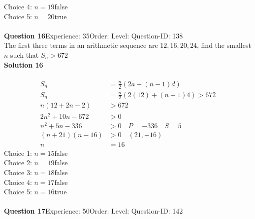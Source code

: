 \documentclass{article}
\begin{document}
Choice 4: \hspace{20pt}$n=19$\hspace{20pt}false\\
Choice 5: \hspace{20pt}$n=20$\hspace{20pt}true\\
\\[4pt]
\noindent\textbf{Question 16}\hspace{20pt}Experience: 35\hspace{20pt}Order: \hspace{20pt}Level: \hspace{20pt}Question-ID: 138\\[2pt]
The first three terms in an arithmetic sequence are $12,16,20,24$, find the smallest $n$ such that $S_n > 672$\\[4pt]
\noindent\textbf{Solution 16}\\[2pt]
\\[-35pt]\begin{align*}
S_n&=\displaystyle\frac{n}{2}(2a+(n-1)d)\\[2pt]
S_n&=\displaystyle\frac{n}{2}(2(12)+(n-1)4)>672\\[2pt]
n(12+2n-2)&>672\\[2pt]
2n^2+10n-672&>0\\[2pt]
n^2+5n-336&>0 \quad P=-336\quad S=5\\[2pt]
(n+21)(n-16)&>0 \quad (21,-16)\\[2pt]
n&=16
\end{align*}
Choice 1: \hspace{20pt}$n=15$\hspace{20pt}false\\
Choice 2: \hspace{20pt}$n=19$\hspace{20pt}false\\
Choice 3: \hspace{20pt}$n=18$\hspace{20pt}false\\
Choice 4: \hspace{20pt}$n=17$\hspace{20pt}false\\
Choice 5: \hspace{20pt}$n=16$\hspace{20pt}true\\
\\[4pt]
\noindent\textbf{Question 17}\hspace{20pt}Experience: 50\hspace{20pt}Order: \hspace{20pt}Level: \hspace{20pt}Question-ID: 142\\[2pt]
\end{document}
